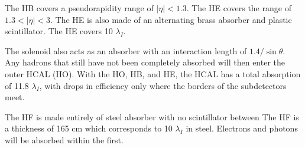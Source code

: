 The HB covers a pseudorapidity range of $|\eta| < 1.3$. The HE covers the range of $1.3 < |\eta| < 3$. The HE is also made of an alternating brass absorber and plastic scintillator. The HE covers 10 $\lambda_I$.

The solenoid also acts as an absorber with an interaction length of $1.4/\sin{\theta}$. Any hadrons that still have not been completely absorbed will then enter the outer HCAL (HO). With the HO, HB, and HE, the HCAL has a total absorption of 11.8 $\lambda_I$, with drops in efficiency only where the borders of the subdetectors meet.

The HF is made entirely of steel absorber with no scintillator between The HF is a thickness of 165 cm which corresponds to 10 $\lambda_I$ in steel. Electrons and photons will be absorbed within the first.